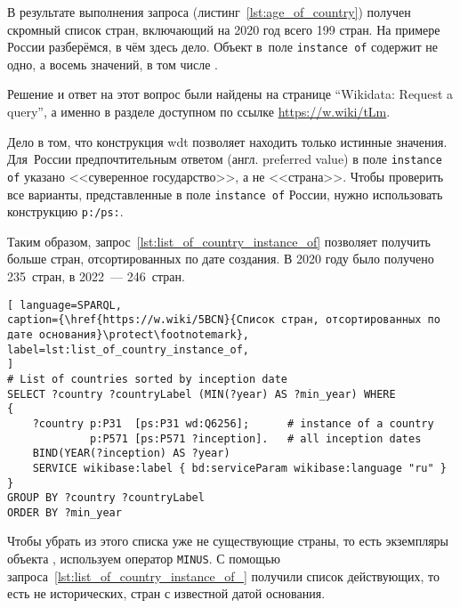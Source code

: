 
В результате выполнения запроса (листинг~\ref{lst:age_of_country}) 
получен скромный список стран, включающий на 2020 год всего 199 стран. 
На примере России разберёмся, в чём здесь дело. 
Объект  в~поле \lstinline|instance of| содержит не одно, а восемь значений, в том числе .
%

Решение и ответ на этот вопрос были найдены на странице ``Wikidata: Request a query'', а именно в разделе доступном по ссылке \href{https://w.wiki/tLm}{https://w.wiki/tLm}.

Дело в том, что конструкция wdt позволяет находить только истинные значения. 
Для~России предпочтительным ответом (англ. preferred value) 
в поле \lstinline|instance of| указано <<суверенное государство>>, а не <<страна>>. 
Чтобы проверить все варианты, представленные в поле \lstinline|instance of| России, 
нужно использовать конструкцию \lstinline|p:/ps:|.

Таким образом, запрос~\ref{lst:list_of_country_instance_of} 
позволяет получить больше стран, отсортированных по дате создания. 
В 2020 году было получено 235~стран, в 2022~--- 246~стран.


\newpage
\begin{lstlisting}[ language=SPARQL, 
caption={\href{https://w.wiki/5BCN}{Список стран, отсортированных по дате основания}\protect\footnotemark},
label=lst:list_of_country_instance_of, 
]
# List of countries sorted by inception date
SELECT ?country ?countryLabel (MIN(?year) AS ?min_year) WHERE
{
    ?country p:P31  [ps:P31 wd:Q6256];      # instance of a country 
             p:P571 [ps:P571 ?inception].   # all inception dates
    BIND(YEAR(?inception) AS ?year)
    SERVICE wikibase:label { bd:serviceParam wikibase:language "ru" }
}
GROUP BY ?country ?countryLabel
ORDER BY ?min_year
\end{lstlisting}

Чтобы убрать из этого списка уже не существующие страны, 
то есть экземпляры объекта , 
используем оператор \lstinline|MINUS|. 
С помощью запроса~\ref{lst:list_of_country_instance_of_} получили список действующих, 
то есть не исторических, стран с известной датой основания.


